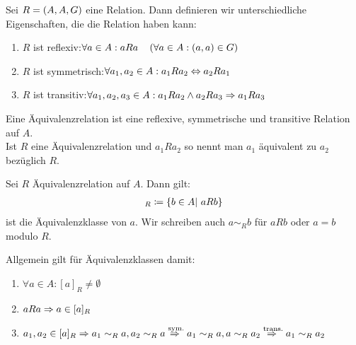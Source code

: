 \begin{definition}[Äquivalenzrelation]
    Sei $R=\left(A, A, G\right)$ eine Relation. Dann definieren wir unterschiedliche Eigenschaften, die die Relation haben kann:
    \begin{enumerate}[label=(\roman*)]
        \item $R$ ist reflexiv:\quad $\forall a\in A: aRa\quad\left(\forall a \in A: (a,a) \in G\right)$
        \item $R$ ist symmetrisch:\quad $\forall a_1, a_2\in A: a_{1}Ra_2\Leftrightarrow{} a_{2}Ra_1$
        \item $R$ ist transitiv:\quad $\forall a_1, a_2, a_3 \in A: a_{1}Ra_{2} \land a_{2}Ra_{3} \Rightarrow{} a_{1}Ra_{3}$
    \end{enumerate}
    Eine Äquivalenzrelation ist eine reflexive, symmetrische und transitive Relation auf $A$.\\
    Ist $R$ eine Äquivalenzrelation und $a_{1}Ra_{2}$ so nennt man $a_{1}$ äquivalent zu $a_{2}$ bezüglich $R$.
\end{definition}

\begin{notation}[Äquivalenzklassen]
    Sei $R$ Äquivalenzrelation auf $A$. Dann gilt:
    \begin{align*}
    [a]
        _{R} \definedas \set{b\in A|~aRb}
    \end{align*} ist die Äquivalenzklasse von $a$. Wir schreiben auch $a\sim_R b$ für $aRb$ oder $a = b$ modulo $R$.
\end{notation}

\begin{beobachtung}
    Allgemein gilt für Äquivalenzklassen damit:
    \theoremescape
    \begin{enumerate}[label=(\roman*)]
        \item $\forall a\in A: [a]_R \neq \emptyset$
        \item $aRa \Rightarrow{} a\in [a]_R$
        \item $a_1, a_2\in [a]_R \Rightarrow{} a_1 \sim_R a, a_2 \sim_R a \overset{\text{sym.}}{\Rightarrow{}} a_1 \sim_R a, a \sim_R a_2 \overset{\text{trans.}}{\Rightarrow{}} a_1\sim_R a_2$
    \end{enumerate}
\end{beobachtung}


